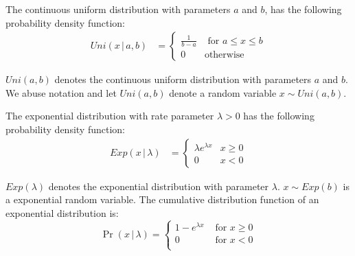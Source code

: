 \begin{definition}
    \label{def:UniformDistribution}
    The continuous uniform distribution with parameters $a$ and $b$, has the following probability density function:
    \begin{equation}
        \begin{split}
            Uni\left(x \,|\,a,b\right)
            &=
            \begin{cases}
                \frac{1}{b-a} & \text{ for } a\leq x\leq b \\
                0             & \text{otherwise}
            \end{cases}
        \end{split}
    \end{equation}
\end{definition}
$Uni\left(a,b\right)$ denotes the continuous uniform distribution with parameters $a$ and $b$. We abuse notation and let $Uni\left( a,b\right)$ denote a random variable $x \sim Uni\left( a,b\right)$.


\begin{definition}
    \label{def:ExponentialDistribution}
    The exponential distribution with rate parameter $\lambda>0$ has the following probability density function:
    \begin{equation}
        \begin{split}
            Exp\left(x \,|\,\lambda\right)            &=
            \begin{cases}
                \lambda e^{\lambda x } & x\geq 0 \\
                0                      & x <0
            \end{cases}
        \end{split}
    \end{equation}
\end{definition}
$Exp\left(\lambda\right)$ denotes the exponential distribution with parameter $\lambda$.
$x \sim Exp\left( b\right)$ is a exponential random variable. The cumulative distribution function of an exponential distribution is:
\begin{equation}
    \Pr\left( x\,|\,\lambda\right)=
    \begin{cases}
        1- e^{\lambda x} & \text{ for } x \geq 0 \\
        0                & \text{ for } x < 0    \\
    \end{cases}
\end{equation}


